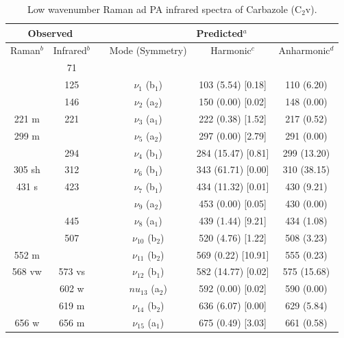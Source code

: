 	
	\begin{table}[H]
		\caption{Low wavenumber Raman ad PA infrared spectra of Carbazole (C$_{2}$v).}
		\begin{center}
			\begin{threeparttable}
				\begin{tabular}{c c c c c c}
					\hline
					\multicolumn{ 2}{c}{Observed} & \multicolumn{1}{c}{} & \multicolumn{ 3}{c}{Predicted$^{a}$} \\ \hline
					Raman$^{b}$ & \multicolumn{1}{c}{Infrared$^{b}$} &  & \multicolumn{1}{c}{Mode (Symmetry)} & \multicolumn{1}{c}{Harmonic$^{c}$} & Anharmonic$^{d}$ \\ \hline
 & \multicolumn{1}{c}{71} &  &  &  &  \\ 
 & \multicolumn{1}{c}{125} &  & $\nu_{1}$ (b$_{1}$) & 103 (5.54) [0.18] & 110 (6.20) \\ 
 & \multicolumn{1}{c}{146} &  & $\nu_{2}$ (a$_{2}$) & 150 (0.00) [0.02] & 148 (0.00) \\ 
 221 m & \multicolumn{1}{c}{221} &  & $\nu_{3}$ (a$_{1}$) & 222 (0.38) [1.52] & 217 (0.52) \\ 
 299 m &  &  & $\nu_{5}$ (a$_{2}$) & 297 (0.00) [2.79] & 291 (0.00) \\ 
 & \multicolumn{1}{c}{294} &  & $\nu_{4}$ (b$_{1}$) & 284 (15.47) [0.81] & 299 (13.20) \\ 
 305 sh & \multicolumn{1}{c}{312} & & $\nu_{6}$ (b$_{1}$) & 343 (61.71) [0.00] & 310 (38.15) \\ 
 431 s & \multicolumn{1}{c}{423} &  & $\nu_{7}$ (b$_{1}$) & 434 (11.32) [0.01] & 430 (9.21) \\ 
 &  &  & $\nu_{9}$ (a$_{2}$) & 453 (0.00) [0.05] & 430 (0.00) \\
 & \multicolumn{1}{c}{445} &  & $\nu_{8}$ (a$_{1}$) & 439 (1.44) [9.21] & 434 (1.08) \\ 
 & \multicolumn{1}{c}{507} &  & $\nu_{10}$ (b$_{2}$)
 & 520 (4.76) [1.22] & 508 (3.23) \\ 
 552 m &  &  & $\nu_{11}$ (b$_{2}$)  & 569 (0.22) [10.91] & 555 (0.23)	 \\ 
 568 vw & 573 vs &  & $\nu_{12}$ (b$_{1}$)  & 582 (14.77) [0.02] &  575 (15.68)	 \\ 
 & 602 w &  & $nu_{13}$ (a$_{2}$) & 592 (0.00) [0.02] & 590 (0.00) \\ 
 & 619 m &  & $\nu_{14}$ (b$_{2}$) & 636 (6.07) [0.00] & 629 (5.84) \\ 
 656 w & 656 m &  & $\nu_{15}$ (a$_{1}$)	 & 675 (0.49) [3.03] & 661 (0.58) \\ 
	\bottomrule
		

\end{tabular}
\end{threeparttable}
\end{center}
\end{table}

